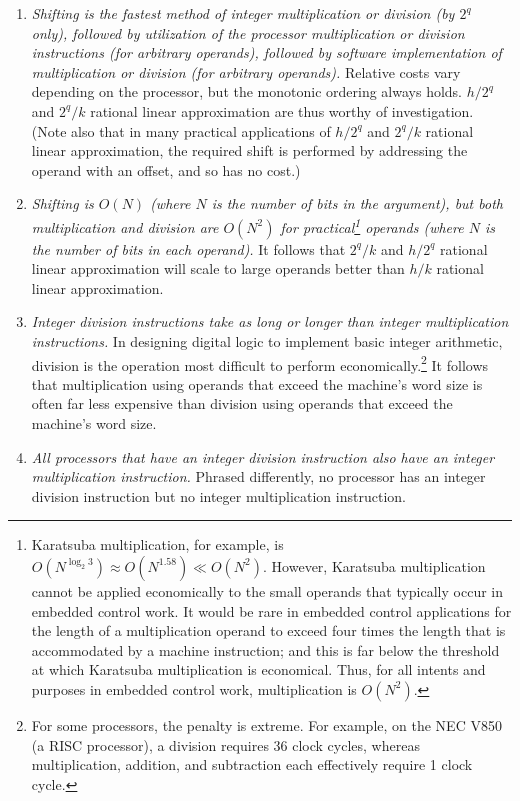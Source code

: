 \begin{enumerate}
\item \label{enum:crat0:shqq0:pis0:01:01a}
      \emph{Shifting is the fastest method of integer multiplication or division
	  (by $2^q$ only),
      followed by utilization of the processor multiplication or division instructions (for arbitrary
	  operands), 
	  followed by software implementation of multiplication or division (for arbitrary operands).}
	  Relative costs vary depending on the processor, but the monotonic
	  ordering always holds.
	  $h/2^q$ and $2^q/k$ rational linear 
	  approximation are thus worthy of investigation.  (Note also that in many practical 
	  applications of $h/2^q$ and $2^q/k$ rational linear approximation, 
	  the required shift is performed by
      addressing the operand with an offset,
	  and so has no cost.)
\item \label{enum:crat0:shqq0:pis0:01:01b}
      \emph{Shifting is $O(N)$ (where $N$ is the number of bits in the argument), 
	  but both
	  multiplication and division are $O(N^2)$ for 
	  practical\footnote{Karatsuba 
	  multiplication, for example, is
	  $O(N^{\log_2 3}) \approx O(N^{1.58}) \ll O(N^2)$.  However, Karatsuba
	  multiplication cannot be applied economically to the small
	  operands that typically occur in embedded control work.  It would
	  be rare in embedded control applications
	  for the length of a multiplication operand to exceed four 
	  times the length that is accommodated by a machine instruction; and this
	  is far below the threshold at which Karatsuba multiplication is
	  economical.  Thus, for all intents and purposes in embedded control work,
	  multiplication is $O(N^2)$.} operands (where 
	  $N$ is the number of bits in each 
	  operand).}  It follows that $2^q/k$ and $h/2^q$ rational 
	  linear approximation
	  will scale to large operands better than $h/k$ rational linear approximation.
\item \label{enum:crat0:shqq0:pis0:01:02a}
      \emph{Integer division instructions take as long or longer than
      integer multiplication instructions.}  In designing digital logic
	  to implement basic integer arithmetic, division is the operation most difficult
      to perform economically.\footnote{For some processors, the penalty is extreme.
	  For example, on the NEC V850 (a RISC processor), 
	  a division requires 36 clock cycles,
	  whereas multiplication, addition, and subtraction each effectively 
	  require 1 clock cycle.}
	  It follows that multiplication using operands that exceed the machine's word size
	  is often far less expensive than division using operands that exceed the 
	  machine's word size. 
\item \label{enum:crat0:shqq0:pis0:01:03a}
      \emph{All processors that have an integer division instruction also
      have an integer multiplication instruction.}  
	  Phrased
	  differently, no processor has an integer division instruction but no
	  integer multiplication instruction.
\end{enumerate}

